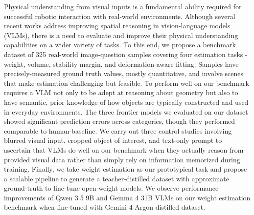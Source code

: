 Physical understanding from visual inputs is a fundamental ability required for successful robotic interaction with real-world environments. Although several recent works address improving spatial reasoning in vision-language models (VLMs), there is a need to evaluate and improve their physical understanding capabilities on a wider variety of tasks. To this end, we propose a benchmark dataset of 325 real-world image-question samples covering four estimation tasks - weight, volume, stability margin, and deformation-aware fitting. Samples have precisely-measured ground truth values, mostly quantitative, and involve scenes that make estimation challenging but feasible. To perform well on our benchmark requires a VLM not only to be adept at reasoning about geometry but also to have semantic, prior knowledge of how objects are typically constructed and used in everyday environments. The three frontier models we evaluated on our dataset showed significant prediction errors across categories, though they performed comparable to human-baseline. We carry out three control studies involving blurred visual input, cropped object of interest, and text-only prompt to ascertain that VLMs do well on our benchmark when they actually reason from provided visual data rather than simply rely on information memorized during training. Finally, we take weight estimation as our prototypical task and propose a scalable pipeline to generate a teacher-distilled dataset with approximate ground-truth to fine-tune open-weight models. We observe performance improvements of Qwen 3.5 9B and Gemma 4 31B VLMs on our weight estimation benchmark when fine-tuned with Gemini 4 Argon distilled dataset.
